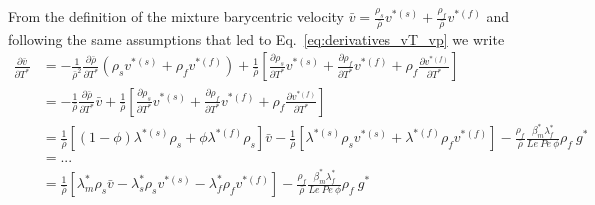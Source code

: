 \documentclass[]{scrreprt}
\begin{document}
From the definition of the mixture barycentric velocity $\bar{v} = \frac{\rho_s}{\bar{\rho}} v^{*(s)} + \frac{\rho_f}{\bar{\rho}} v^{*(f)}$ and following the same assumptions that led to Eq.~\ref{eq:derivatives_vT_vp} we write
\begin{subequations}
  \begin{align}
  \frac{\partial \bar{v}}{\partial T^*} &= -\frac{1}{\bar{\rho}^2}\frac{\partial \bar{\rho}}{\partial T^*} (\rho_s v^{*(s)} + \rho_f v^{*(f)}) + \frac{1}{\bar{\rho}} \left[ \frac{\partial \rho_s}{\partial T^*}v^{*(s)} +\frac{\partial \rho_f}{\partial T^*}v^{*(f)} +\rho_f\frac{\partial v^{*(f)}}{\partial T^*}  \right]\\ \nonumber
  &= -\frac{1}{\bar{\rho}}\frac{\partial \bar{\rho}}{\partial T^*}\bar{v} + \frac{1}{\bar{\rho}} \left[ \frac{\partial \rho_s}{\partial T^*}v^{*(s)} +\frac{\partial \rho_f}{\partial T^*}v^{*(f)} +\rho_f\frac{\partial v^{*(f)}}{\partial T^*}  \right]\\ \nonumber
  &= \frac{1}{\bar{\rho}}\left[(1-\phi)\lambda^{*(s)}\rho_s + \phi\lambda^{*(f)}\rho_s \right]\bar{v} - \frac{1}{\bar{\rho}} \left[ \lambda^{*(s)}\rho_s v^{*(s)} + \lambda^{*(f)}\rho_f v^{*(f)} \right] - \frac{\rho_f}{\bar{\rho}}\frac{\beta^*_m \lambda^*_f}{Le\:Pe\:\phi}\rho_f\:g^*  \\ \nonumber
  &= ... \\ \nonumber
  &= \frac{1}{\bar{\rho}}\left[ \lambda^*_m \rho_s \bar{v} - \lambda^*_s \rho_s v^{*(s)} - \lambda^*_f \rho_f v^{*(f)}    \right] - \frac{\rho_f}{\bar{\rho}}\frac{\beta^*_m \lambda^*_f}{Le\:Pe\:\phi}\rho_f\:g^*  \\ \nonumber
  \end{align}
\end{subequations}
\end{document}
